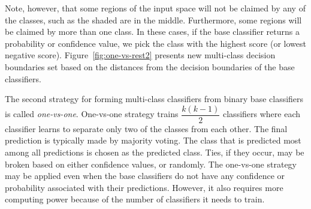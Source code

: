 Note, however, that some regions of the input space will not be claimed
by any of the classes, such as the shaded are in the middle.
Furthermore, some regions will be claimed by more than one class.
In these cases, if the base classifier returns a probability or confidence value,
we pick the class with the highest score (or lowest negative score).
Figure~\ref{fig:one-vs-rest2} presents new multi-class decision boundaries set
based on the distances from the decision boundaries of the base classifiers.
\begin{marginfigure}[-5\baselineskip]
  \centering
  \caption{\label{fig:one-vs-rest2}%
    One-vs-rest classification with ambiguities resolved based on
    the distance from the decision boundary.
  }
\end{marginfigure}

The second strategy for forming multi-class classifiers from
binary base classifiers is called \emph{one-vs-one}.
One-vs-one strategy trains $\dfrac{k(k-1)}{2}$ classifiers
where each classifier learns to separate only two of the classes
from each other.
The final prediction is typically made by majority voting.
The class that is predicted most among all predictions
is chosen as the predicted class.
Ties, if they occur, may be broken based on either confidence values,
or randomly.
The one-vs-one strategy may be applied even when the base classifiers
do not have any confidence or probability associated with their predictions.
However, it also requires more computing power
because of the number of classifiers it needs to train.

